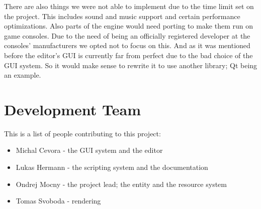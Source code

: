 \documentclass[a4paper,12pt]{article}
\begin{document}
There are also things we were not able to implement due to the time limit set on the project. This includes sound and music support and certain performance optimizations. Also parts of the engine would need porting to make them run on game consoles. Due to the need of being an officially registered developer at the consoles' manufacturers we opted not to focus on this. And as it was mentioned before the editor's GUI is currently far from perfect due to the bad choice of the GUI system. So it would make sense to rewrite it to use another library; Qt being an example.

\section{Development Team}
This is a list of people contributing to this project:
\begin{itemize}
\item
 Michal Cevora - the GUI system and the editor
 \item
Lukas Hermann - the scripting system and the documentation
\item
Ondrej Mocny - the project lead; the entity and the resource system
\item
Tomas Svoboda - rendering
\end{itemize}
\end{document}
